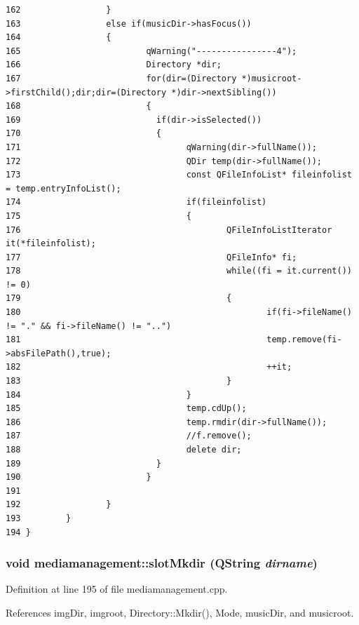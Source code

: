 \begin{verbatim}
162                 }
163                 else if(musicDir->hasFocus())
164                 {
165                         qWarning("----------------4");
166                         Directory *dir;
167                         for(dir=(Directory *)musicroot->firstChild();dir;dir=(Directory *)dir->nextSibling())
168                         {
169                           if(dir->isSelected())
170                           {
171                                 qWarning(dir->fullName());
172                                 QDir temp(dir->fullName());
173                                 const QFileInfoList* fileinfolist = temp.entryInfoList();
174                                 if(fileinfolist) 
175                                 {
176                                         QFileInfoListIterator it(*fileinfolist);
177                                         QFileInfo* fi;
178                                         while((fi = it.current()) != 0)
179                                         {
180                                                 if(fi->fileName() != "." && fi->fileName() != "..") 
181                                                 temp.remove(fi->absFilePath(),true);
182                                                 ++it;
183                                         }
184                                 }       
185                                 temp.cdUp();
186                                 temp.rmdir(dir->fullName());
187                                 //f.remove();
188                                 delete dir;
189                           }
190                         }
191                         
192                 }
193         }
194 }
\end{verbatim}\normalsize 
{}
\subsubsection{\setlength{\rightskip}{0pt plus 5cm}void mediamanagement::slot\-Mkdir (QString {\em dirname})\hspace{0.3cm}{\tt  [slot]}}\label{classmediamanagement_mediamanagementi2}




Definition at line 195 of file mediamanagement.cpp.

References img\-Dir, imgroot, Directory::Mkdir(), Mode, music\-Dir, and musicroot.



